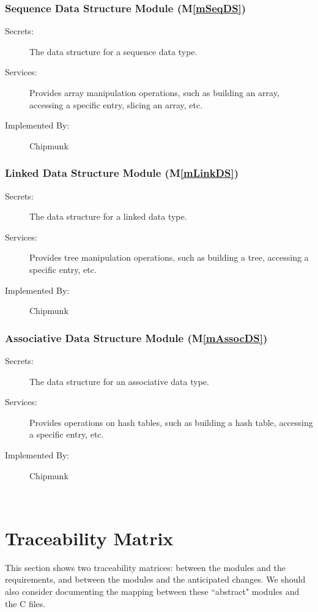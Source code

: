 \documentclass[12pt]{article}
\newcommand{\mref}[1]{M\ref{#1}}
\begin{document}
\subsubsection{Sequence Data Structure Module (\mref{mSeqDS})}

\begin{description}
\item[Secrets:] The data structure for a sequence data type.
\item[Services:] Provides array manipulation operations, such as building an array, accessing a specific entry, slicing an array, etc.
\item[Implemented By:] Chipmunk
\end{description}

\subsubsection{Linked Data Structure Module (\mref{mLinkDS})}

\begin{description}
\item[Secrets:] The data structure for a linked data type.
\item[Services:] Provides tree manipulation operations, such as building a tree, accessing a specific entry, etc.
\item[Implemented By:] Chipmunk
\end{description}

\subsubsection{Associative Data Structure Module (\mref{mAssocDS})}

\begin{description}
\item[Secrets:] The data structure for an associative data type.
\item[Services:] Provides operations on hash tables, such as building a hash table, accessing a specific entry, etc.
\item[Implemented By:] Chipmunk
\end{description}

~\newpage

\section{Traceability Matrix} \label{SecTM}

This section shows two traceability matrices: between the modules and the
requirements, and between the modules and the anticipated changes. We should also consider documenting the mapping between these ``abstract" modules and the C files.
\end{document}
